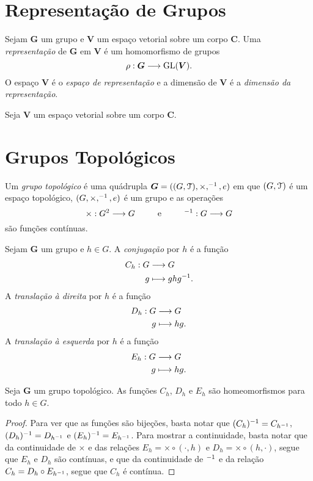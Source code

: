 \section{Representação de Grupos}

\begin{defi}
Sejam $\bm G$ um grupo e $\bm V$ um espaço vetorial sobre um corpo $\bm C$. Uma \emph{representação} de $\bm G$ em $\bm V$ é um homomorfismo de grupos
	\begin{equation*}
	\rho: \bm G \longrightarrow \mathrm{GL}(\bm V).
	\end{equation*}
O espaço $\bm V$ é o \emph{espaço de representação} e a dimensão de $\bm V$ é a \emph{dimensão da representação}.
\end{defi}

\begin{defi}
Seja $\bm V$ um espaço vetorial sobre um corpo $\bm C$.
\end{defi}




\section{Grupos Topológicos}

\begin{defi}
Um \emph{grupo topológico} é uma quádrupla $\bm G = ((G,\mathcal{T}),\times,^{-1},e)$ em que $(G,\mathcal{T})$ é um espaço topológico, $(G,\times,^{-1},e)$ é um grupo e as operações
	\begin{equation*}
	\times: G^2 \longrightarrow G \qquad\text{\ \ e\ \ }\qquad ^{-1}: G \longrightarrow G
	\end{equation*}
são funções contínuas.%
\end{defi}

\begin{defi}
Sejam $\bm G$ um grupo e $h \in G$. A \emph{conjugação} por $h$ é a função
	\begin{align*}
	{C_h}: {G} &\longrightarrow {G} \\{g} &\longmapsto {ghg^{-1}}.
	\end{align*}
A \emph{translação à direita} por $h$ é a função
	\begin{align*}
	{D_h}: {G} &\longrightarrow {G} \\{g} &\longmapsto {hg}.
	\end{align*}
A \emph{translação à esquerda} por $h$ é a função
	\begin{align*}
	{E_h}: {G} &\longrightarrow {G} \\{g} &\longmapsto {hg}.
	\end{align*}
\end{defi}

\begin{prop}
Seja $\bm G$ um grupo topológico. As funções $C_h$, $D_h$ e $E_h$ são homeomorfismos para todo $h \in G$.
\end{prop}
\begin{proof}
Para ver que as funções são bijeções, basta notar que $(C_h)^{-1} = C_{h ^{-1}}$, $(D_h)^{-1} = D_{h ^{-1}}$ e $(E_h)^{-1} = E_{h ^{-1}}$. Para mostrar a continuidade, basta notar que da continuidade de $\times$ e das relações $E_h = \times \circ (\bm\cdot,h)$ e $D_h = \times \circ (h,\bm\cdot)$, segue que $E_h$ e $D_h$ são contínuas, e que da continuidade de $^{-1}$ e da relação $C_h = D_h \circ E_{h^{-1}}$, segue que $C_h$ é contínua.
\end{proof}

